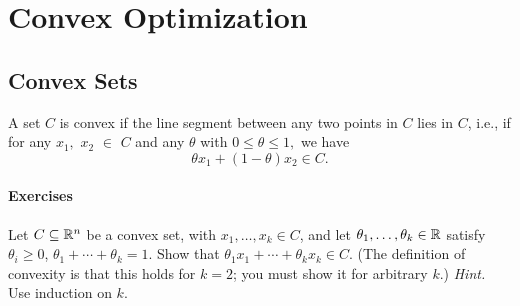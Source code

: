 \documentclass[12pt]{book}
\begin{document}






\chapter{Convex Optimization}


\section{Convex Sets}


\begin{definition}
    A set $C$ is convex if the line segment between any two points in $C$ lies in $C$, i.e., 
    if for any $x_1,$ $x_2$ $\in$ $C$ and any $\theta$ with $ 0 \le \theta \le 1,$ we have
    \[
        \theta x_1 + (1 - \theta) x_2 \in C.
    \]
\end{definition}


\subsubsection*{Exercises}


\begin{exercise}
    Let $C \subseteq \mathbb{R}^n$ be a convex set, with $x_1, \ldots, x_k \in C$, and let $\theta_1, \ldots, \theta_k \in \mathbb{R}$ satisfy $\theta_i \geq 0$, $\theta_1 + \cdots + \theta_k = 1$. Show that $\theta_1 x_1 + \cdots + \theta_k x_k \in C$. (The definition of convexity is that this holds for $k = 2$; you must show it for arbitrary $k$.) \textit{Hint.} Use induction on $k$.
\end{exercise}
\end{document}
